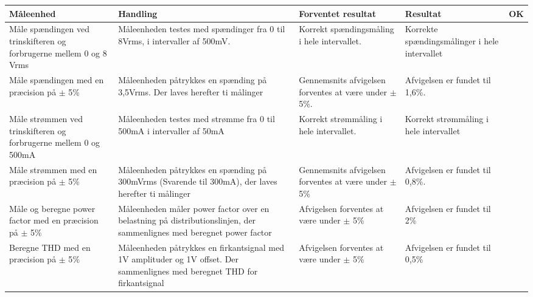 \begin{longtable}{|p{4cm}|p{3cm}|p{3cm}|p{3cm}|p{1cm}|}
	\hline
	\textbf{Måleenhed} & \textbf{Handling} & \textbf{Forventet resultat} & \textbf{Resultat} &\textbf{OK} \\\hline
	Måle spændingen ved trinskifteren og forbrugerne mellem 0 og 8 Vrms & Måleenheden testes med spændinger fra 0 til 8Vrms, i intervaller af 500mV. & Korrekt spændingsmåling i hele intervallet. & Korrekte spændingsmålinger i hele intervallet & \checkmark\\\hline
	Måle spændingen med en præcision på $\pm$ 5\%& Måleenheden påtrykkes en spænding på 3,5Vrms. Der laves herefter ti målinger& Gennemsnits afvigelsen forventes at være under $\pm$5\%.& Afvigelsen er fundet til 1,6\%. &\checkmark\\\hline
	Måle strømmen ved trinskifteren og forbrugerne mellem 0 og 500mA& Måleenheden testes med strømme fra 0 til 500mA i intervaller af 50mA&Korrekt strømmåling i hele intervallet.&Korrekt strømmåling i hele intervallet&\checkmark\\\hline
	Måle strømmen med en præcision på $\pm$ 5\%&Måleenheden påtrykkes en spænding på 300mVrms (Svarende til 300mA), der laves herefter ti målinger&Gennemsnits afvigelsen forventes at være under $\pm$5\%&Afvigelsen er fundet til 0,8\%.&\checkmark\\\hline
	Måle og beregne power factor med en præcision på $\pm$ 5$\%$&Måleenheden måler power factor over en belastning på distributionslinjen, der sammenlignes med beregnet power factor&Afvigelsen forventes at være under $\pm$ 5\% &Afvigelsen er fundet til 2\% &\checkmark \\\hline
	Beregne THD med en præcision på $\pm$ 5$\%$&Måleenheden påtrykkes en firkantsignal med 1V amplituder og 1V offset. Der sammenlignes med beregnet THD for firkantsignal& Afvigelsen forventes at være under $\pm$ 5\%&Afvigelsen er fundet til 0,5\%&\checkmark\\\hline
	
\end{longtable}


